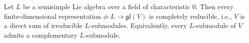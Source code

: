 Let $L$ be a semisimple Lie algebra over a field of characteristic 0. Then every finite-dimensional representation $\phi: L \rightarrow \mathfrak{gl}(V)$ is completely reducible, i.e., $V$ is a direct sum of irreducible $L$-submodules. Equivalently, every $L$-submodule of $V$ admits a complementary $L$-submodule.
